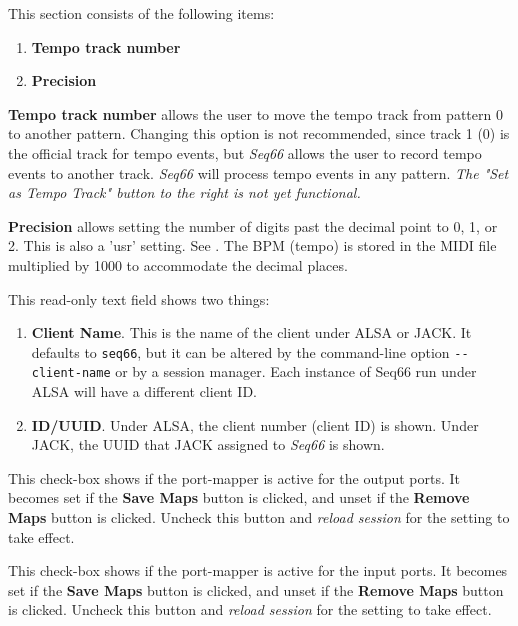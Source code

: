    This section consists of the following items:

   \begin{enumerate}
      \item \textbf{Tempo track number}
      \item \textbf{Precision}
   \end{enumerate}

   \textbf{Tempo track number}
   allows the user to move the tempo track from pattern 0 to
   another pattern.  Changing this option is not recommended, since track 1 (0)
   is the official track for tempo events, but \textsl{Seq66} allows the
   user to record tempo events to another track.  \textsl{Seq66} will
   process tempo events in any pattern.
   \textsl{The "Set as Tempo Track" button to the right is not yet functional.}

   \textbf{Precision}
   allows setting the number of digits past the decimal point to 0, 1, or 2.
   This is also a 'usr' setting.
   See .
   The BPM (tempo) is stored in the MIDI file multiplied by 1000 to accommodate
   the decimal places.

   This read-only text field shows two things:

   \begin{enumerate}
      \item \textbf{Client Name}.
         This is the name of the client under ALSA or JACK.  It defaults to
         \texttt{seq66}, but it can be altered by the command-line option
         \texttt{-{}-client-name} or by a session manager.
         Each instance of Seq66 run under ALSA will have a different client ID.
      \item \textbf{ID/UUID}.
         Under ALSA, the client number (client ID) is shown.
         Under JACK, the UUID that JACK assigned to \textsl{Seq66} is shown.
   \end{enumerate}

   This check-box shows if the port-mapper is active for the output ports.
   It becomes set if the \textbf{Save Maps} button is clicked, and unset if the
   \textbf{Remove Maps} button is clicked.
   Uncheck this button and \textsl{reload session} for the setting
   to take effect.

   This check-box shows if the port-mapper is active for the input ports.
   It becomes set if the \textbf{Save Maps} button is clicked, and unset if the
   \textbf{Remove Maps} button is clicked.
   Uncheck this button and \textsl{reload session} for the setting
   to take effect.

